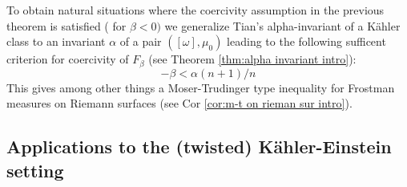 \documentclass[11pt,oneside,english]{amsart}
\numberwithin{equation}{section}
\numberwithin{figure}{section}
\theoremstyle{plain}
\theoremstyle{plain}
\theoremstyle{plain}
\theoremstyle{plain}
\theoremstyle{remark}
\theoremstyle{definition}
\begin{document}
To obtain natural situations where the coercivity assumption in the
previous theorem is satisfied ( for $\beta<0)$ we generalize Tian's
alpha-invariant of a Kähler class \cite{ti1} to an invariant $\alpha$
of a pair $([\omega],\mu_{0})$ leading to the following sufficent
criterion for coercivity of $F_{\beta}$ (see Theorem \ref{thm:alpha invariant intro}):
\begin{equation}
-\beta<\alpha(n+1)/n\label{eq:crit on alpha inv}
\end{equation}
This gives among other things a Moser-Trudinger type inequality for
Frostman measures on Riemann surfaces (see Cor \ref{cor:m-t on rieman sur intro}).

\subsection{Applications to the (twisted) Kähler-Einstein setting }
\end{document}
